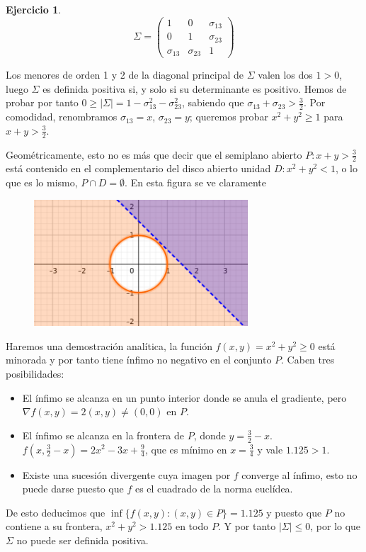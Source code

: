 \documentclass[12pt,spanish]{article}
\theoremstyle{definition}
\newtheorem{exercise}{Ejercicio}
\begin{document}
\begin{exercise} %
  \[\Sigma=
    \begin{pmatrix}
      1 & 0 & \sigma_{13} \\
      0 & 1 & \sigma_{23} \\
      \sigma_{13} & \sigma_{23} & 1
    \end{pmatrix}
  \]

  Los menores de orden 1 y 2 de la diagonal principal de $\Sigma$
  valen los dos $1>0$, luego $\Sigma$ es definida positiva si, y solo
  si su determinante es positivo. Hemos de probar por tanto
  $0\geq|\Sigma|=1-\sigma_{13}^2-\sigma_{23}^2$, sabiendo que
  $\sigma_{13}+\sigma_{23}>\frac{3}{2}$. Por comodidad, renombramos
  $\sigma_{13}=x$, $\sigma_{23}=y$; queremos probar $x^2+y^2\geq 1$
  para $x+y>\frac{3}{2}$.

  Geométricamente, esto no es más que decir que el semiplano abierto
  $P:x+y>\frac{3}{2}$ está contenido en el complementario del disco
  abierto unidad $D:x^2+y^2 < 1$, o lo que es lo mismo,
  $P\cap D=\emptyset$. En esta figura se ve claramente
  \begin{figure}[H]
    \centering
    \includegraphics[width=80mm]{ej1-5.png}
  \end{figure}

  Haremos una demostración analítica, la función
  $f(x,y)=x^2+y^2\geq 0$ está minorada y por tanto tiene ínfimo no
  negativo en el conjunto $P$. Caben tres posibilidades:
  \begin{itemize}
  \item El ínfimo se alcanza en un punto interior donde se anula el
    gradiente, pero $\nabla f(x,y)=2(x,y)\neq(0,0)$ en $P$.
  \item El ínfimo se alcanza en la frontera de $P$, donde
    $y=\frac{3}{2}-x$. $f(x,\frac{3}{2}-x)=2x^2-3x+\frac{9}{4}$, que
    es mínimo en $x=\frac{3}{4}$ y vale $1.125>1$.
  \item Existe una sucesión divergente cuya imagen por $f$ converge al
    ínfimo, esto no puede darse puesto que $f$ es el cuadrado de la
    norma euclídea.
  \end{itemize}

  De esto deducimos que $\inf\{f(x,y) : (x,y)\in P\}=1.125$ y puesto
  que $P$ no contiene a su frontera, $x^2+y^2>1.125$ en todo $P$. Y
  por tanto $|\Sigma|\leq 0$, por lo que $\Sigma$ no puede ser
  definida positiva.
\end{exercise}
\end{document}
